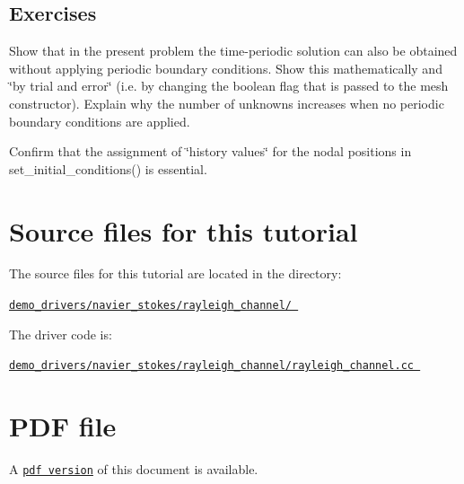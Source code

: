 \hypertarget{index_ex}{}\subsection{Exercises}\label{index_ex}

\begin{DoxyEnumerate}
\item Show that in the present problem the time-\/periodic solution can also be obtained without applying periodic boundary conditions. Show this mathematically and \char`\"{}by trial and error\char`\"{} (i.\+e. by changing the boolean flag that is passed to the mesh constructor). Explain why the number of unknowns increases when no periodic boundary conditions are applied.
\item Confirm that the assignment of \char`\"{}history values\char`\"{} for the nodal positions in {\ttfamily set\+\_\+initial\+\_\+conditions()} is essential.
\end{DoxyEnumerate}



 

\hypertarget{index_sources}{}\section{Source files for this tutorial}\label{index_sources}

\begin{DoxyItemize}
\item The source files for this tutorial are located in the directory\+: \begin{center} \href{../../../../demo_drivers/navier_stokes/rayleigh_channel/}{\tt demo\+\_\+drivers/navier\+\_\+stokes/rayleigh\+\_\+channel/ } \end{center} 
\item The driver code is\+: \begin{center} \href{../../../../demo_drivers/navier_stokes/rayleigh_channel/rayleigh_channel.cc}{\tt demo\+\_\+drivers/navier\+\_\+stokes/rayleigh\+\_\+channel/rayleigh\+\_\+channel.\+cc } \end{center} 
\end{DoxyItemize}



 

 \hypertarget{index_pdf}{}\section{P\+D\+F file}\label{index_pdf}
A \href{../latex/refman.pdf}{\tt pdf version} of this document is available. 
